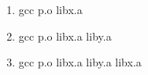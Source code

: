 \documentclass{article}
\begin{document}
\begin{enumerate}[label=\textbf{\Alph*.}]
	\item gcc p.o libx.a
	\item gcc p.o libx.a liby.a
	\item gcc p.o libx.a liby.a libx.a
\end{enumerate}
\end{document}
